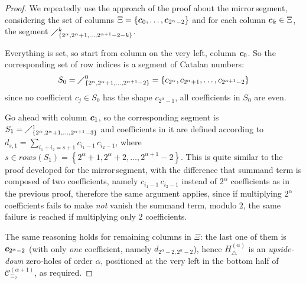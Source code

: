 \begin{proof}
We repeatedly use the approach
of the proof about the \flqq mirror\frqq\,segment, considering the set of columns 
$\Xi=\lbrace \boldsymbol{c}_{0},\ldots, \boldsymbol{c}_{2^{{\alpha}}-2}\rbrace$ and
for each column $\boldsymbol{c}_{k}\in\Xi$, the segment
    $\diagup_{\lbrace 2^{\alpha},2^{\alpha}+1,\ldots,2^{\alpha+1}-2-k\rbrace}^{k}$.

Everything is set, so start from column on the very left, column $\boldsymbol{c}_{0}$.
So the corresponding set of row indices  is a segment of Catalan numbers:
\begin{displaymath}
    S_{0}=\diagup_{\lbrace 2^{\alpha},2^{\alpha}+1,\ldots,2^{\alpha+1}-2\rbrace}^{0}
        = \lbrace c_{2^{\alpha}},c_{2^{\alpha}+1},\ldots,c_{2^{\alpha+1}-2}\rbrace
\end{displaymath}
since no coefficient $c_{j}\in S_{0}$ has the shape $c_{2^{\alpha}-1}$, 
all coefficients in $S_{0}$ are even.

Go ahead with column $\boldsymbol{c}_{1}$, so the corresponding segment is
    $S_{1}=\diagup_{\lbrace 2^{\alpha},2^{\alpha}+1,\ldots,2^{\alpha+1}-3\rbrace}^{1}$
and coefficients in it are defined according to 
$d_{s, 1} = \sum_{i_{1}+i_{2}=s+1} {c_{i_{1}-1}\,c_{i_{2}-1}}$,
where $s\in rows(S_{1})= \left\lbrace 2^{\alpha}+1,2^{\alpha}+2,\ldots,2^{\alpha+1}-2\right\rbrace$. 
This is quite similar to the proof developed for the \flqq mirror\frqq\,segment,
with the difference that summand term is composed of two coefficients, namely
$c_{i_{1}-1}\,c_{i_{2}-1}$ instead of $2^{{\alpha}}$ coefficients as in the previous proof, 
therefore the same argument applies,
since if multiplying $2^{{\alpha}}$ coefficients fails to make \emph{not} vanish
the summand term, modulo $2$, the same failure is reached if multiplying only $2$ coefficients.

The same reasoning holds for remaining columns in $\Xi$: the last one of them is 
$\boldsymbol{c}_{2^{\alpha}-2}$ (with only \emph{one} coefficient, namely $d_{2^{\alpha}-2,2^{\alpha}-2}$), 
hence $H_{\bigtriangleup}^{({\alpha})}$ is an \emph{upside-down} zero-holes of order $\alpha$,
positioned at the very left in the bottom half of $\mathcal{C}_{\equiv_{2}}^{(\alpha+1)}$, as required.

\end{proof}

